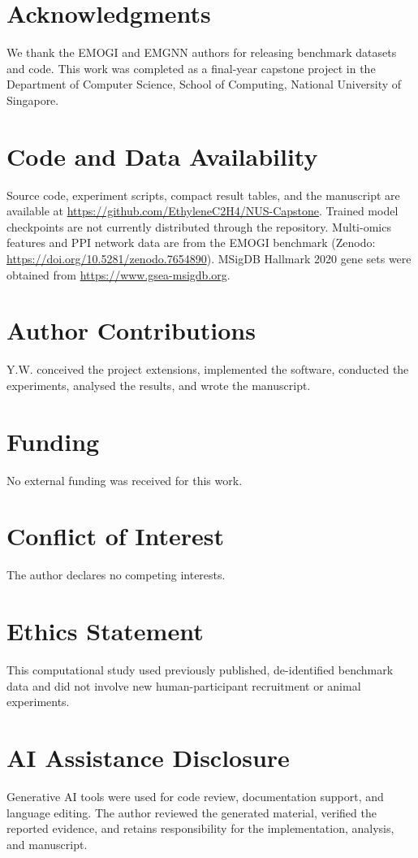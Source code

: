 
\section*{Acknowledgments}
We thank the EMOGI and EMGNN authors for releasing benchmark datasets and code.
This work was completed as a final-year capstone project in the Department of
Computer Science, School of Computing, National University of Singapore.

\section*{Code and Data Availability}
Source code, experiment scripts, compact result tables, and the manuscript are
available at \url{https://github.com/EthyleneC2H4/NUS-Capstone}. Trained model
checkpoints are not currently distributed through the repository. Multi-omics
features and PPI network data are from the EMOGI benchmark (Zenodo:
\url{https://doi.org/10.5281/zenodo.7654890}). MSigDB Hallmark 2020 gene sets were
obtained from \url{https://www.gsea-msigdb.org}.

\section*{Author Contributions}
Y.W. conceived the project extensions, implemented the software, conducted the
experiments, analysed the results, and wrote the manuscript.

\section*{Funding}
No external funding was received for this work.

\section*{Conflict of Interest}
The author declares no competing interests.

\section*{Ethics Statement}
This computational study used previously published, de-identified benchmark data
and did not involve new human-participant recruitment or animal experiments.

\section*{AI Assistance Disclosure}
Generative AI tools were used for code review, documentation support, and language
editing. The author reviewed the generated material, verified the reported evidence,
and retains responsibility for the implementation, analysis, and manuscript.
